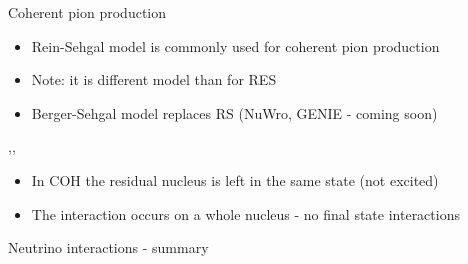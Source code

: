 \begin{slide}[toc=COH pion production]{Coherent pion production}
\null\vfill

  \twocolumn
  {
    \begin{itemize}
      \item Rein-Sehgal model is commonly used for coherent pion production
      \item Note: it is different model than for RES
      \item Berger-Sehgal model replaces RS (NuWro, GENIE - coming soon)
    \end{itemize}
  }
  {
    \sep\sep
    \scalebox{0.75}{}
  }
  
  \vspace*{-10pt}
  
  
  \begin{itemize}
    \item In COH the residual nucleus is left in the same state (not excited)
    \item The interaction occurs on a whole nucleus - no final state interactions
  \end{itemize}

\vfill\null
\end{slide}


\begin{slide}[toc=Summary]{Neutrino interactions - summary}
\null\vfill

  

\vfill\null
\end{slide}
